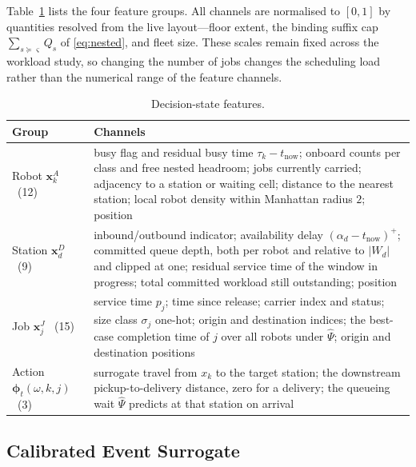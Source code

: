 Table~\ref{tab:features} lists the four feature groups. All channels are
normalised to $[0,1]$ by quantities resolved from the live layout---floor
  extent, the binding suffix cap $\sum_{s\succeq\varsigma}Q_s$ of
  \eqref{eq:nested}, and fleet size. These scales remain fixed across the
  workload study, so changing the number of jobs changes the scheduling
  load rather than the numerical range of the feature channels.

\begin{table}[t]
\caption{Decision-state features.}
\label{tab:features}
\centering
\small
\begin{tabular}{@{}lp{}@{}}
\toprule
Group & Channels \\
\midrule
Robot $\bm x^A_k$ \ (12)
 & busy flag and residual busy time $\tau_k-t_{\mathrm{now}}$; onboard counts
   per class and free nested headroom; jobs currently carried; adjacency
   to a station or waiting cell; distance to the nearest station; local
   robot density within Manhattan radius $2$; position \\[2pt]
Station $\bm x^D_d$ \ (9)
 & inbound/outbound indicator; availability delay
   $(\alpha_d-t_{\mathrm{now}})^+$; committed queue depth, both per robot and
   relative to $|W_d|$ and clipped at one; residual service time of the
   window in progress; total committed workload still outstanding;
   position \\[2pt]
Job $\bm x^J_j$ \ (15)
 & service time $p_j$; time since release; carrier index and status; size
   class $\sigma_j$ one-hot; origin and destination indices; the best-case
   completion time of $j$ over all robots under $\hat\Psi$; origin and
   destination positions \\[2pt]
Action $\bm\phi_t(\omega,k,j)$ \ (3)
 & surrogate travel from $x_k$ to the target station; the downstream
   pickup-to-delivery distance, zero for a delivery; the queueing wait
   $\hat\Psi$ predicts at that station on arrival \\
\bottomrule
\end{tabular}
\end{table}

\subsection{Calibrated Event Surrogate}
\label{sec:calibration}

